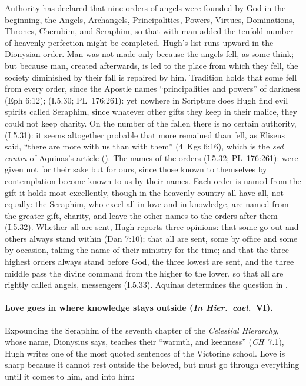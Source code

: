 \noindent Authority has declared that nine orders of angels were founded by
God in the beginning, the Angels, Archangels, Principalities, Powers,
Virtues, Dominations, Thrones, Cherubim, and Seraphim, so that with man
added the tenfold number of heavenly perfection might be completed. Hugh's
list runs upward in the Dionysian order. Man was not made only because the
angels fell, as some think; but because man, created afterwards, is led to
the place from which they fell, the society diminished by their fall is
repaired by him. Tradition holds that some fell from every order, since the
Apostle names ``principalities and powers'' of darkness (Eph 6:12);
 (I.5.30; PL~176:261): yet nowhere in Scripture does Hugh find evil
spirits called Seraphim, since whatever other gifts they keep in their
malice, they could not keep charity. On the number of the fallen there is
no certain authority,  (I.5.31): it seems altogether probable that more
remained than fell, as Eliseus said, ``there are more with us than with
them'' (4~Kgs 6:16), which is the \emph{sed contra} of Aquinas's article
(). The names of the orders  (I.5.32; PL~176:261): were given not for their sake
but for ours, since those known to themselves by contemplation become known
to us by their names. Each order is named from the gift it holds most
excellently, though in the heavenly country all have all, not equally: the
Seraphim, who excel all in love and in knowledge, are named from the
greater gift, charity, and leave the other names to the orders after them
(I.5.32). Whether all are sent, Hugh reports three opinions: that some go
out and others always stand within (Dan 7:10); that all are sent, some by
office and some by occasion, taking the name of their ministry for the
time; and that the three highest orders always stand before God, the three
lowest are sent, and the three middle pass the divine command from the
higher to the lower, so that all are rightly called angels, messengers
(I.5.33). Aquinas determines the question in .

\paragraph{Love goes in where knowledge stays outside (\emph{In Hier.\
cael.}\ VI).} Expounding the Seraphim of the seventh chapter of the
\emph{Celestial Hierarchy}, whose name, Dionysius says, teaches their
``warmth, and keenness'' (\emph{CH}~7.1), Hugh
writes one of the most quoted sentences of the Victorine school. Love is
sharp because it cannot rest outside the beloved, but must go through
everything until it comes to him, and into him:


